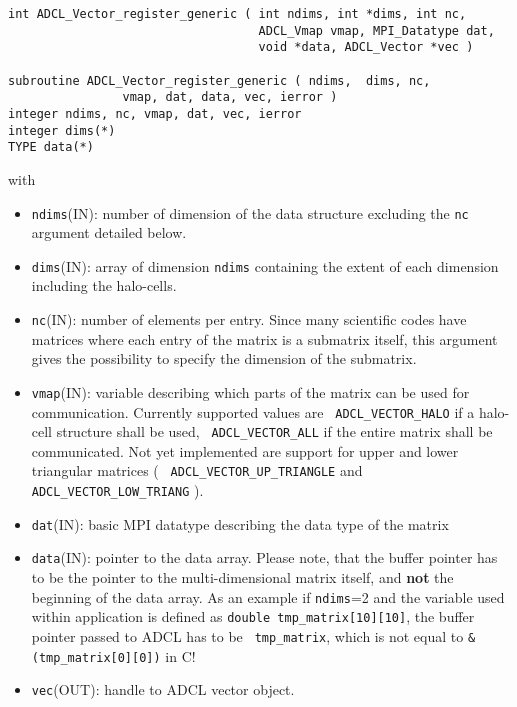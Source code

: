 \hspace{1cm}
\begin{verbatim}
int ADCL_Vector_register_generic ( int ndims, int *dims, int nc, 
                                   ADCL_Vmap vmap, MPI_Datatype dat, 
                                   void *data, ADCL_Vector *vec )

subroutine ADCL_Vector_register_generic ( ndims,  dims, nc, 
                vmap, dat, data, vec, ierror )
integer ndims, nc, vmap, dat, vec, ierror
integer dims(*)
TYPE data(*)
\end{verbatim}
with
\begin{itemize}
\item {\tt ndims}(IN): number of dimension of the data structure excluding the
  {\tt nc} argument detailed below.
\item {\tt dims}(IN): array of dimension {\tt ndims} containing the extent of
  each dimension including the halo-cells.
\item {\tt nc}(IN): number of elements per entry. Since many scientific codes
  have matrices where each entry of the matrix is a submatrix itself, this
  argument gives the possibility to specify the dimension of the submatrix.
\item {\tt vmap}(IN): variable describing which parts of the matrix can be
  used for communication. Currently supported values are {\tt
    ADCL\_VECTOR\_HALO} if a halo-cell structure shall be used, {\tt
    ADCL\_VECTOR\_ALL} if the entire matrix shall be communicated. Not yet
  implemented are support for upper and lower triangular matrices ( {\tt
    ADCL\_VECTOR\_UP\_TRIANGLE} and {\tt ADCL\_VECTOR\_LOW\_TRIANG} ).
\item {\tt dat}(IN): basic MPI datatype describing the data type of the matrix
\item {\tt data}(IN): pointer to the data array. Please note, that the buffer
  pointer has to be the pointer to the multi-dimensional matrix itself, and
  {\bf not} the beginning of the data array. As an example if {\tt ndims}=2
  and the variable used within application is defined as {\tt double
    tmp\_matrix[10][10]}, the buffer pointer passed to ADCL has to be {\tt
    tmp\_matrix}, which is not equal to {\tt \&(tmp\_matrix[0][0])} in C!
\item {\tt vec}(OUT): handle to ADCL vector object.
\end{itemize}

\hspace{1cm}

